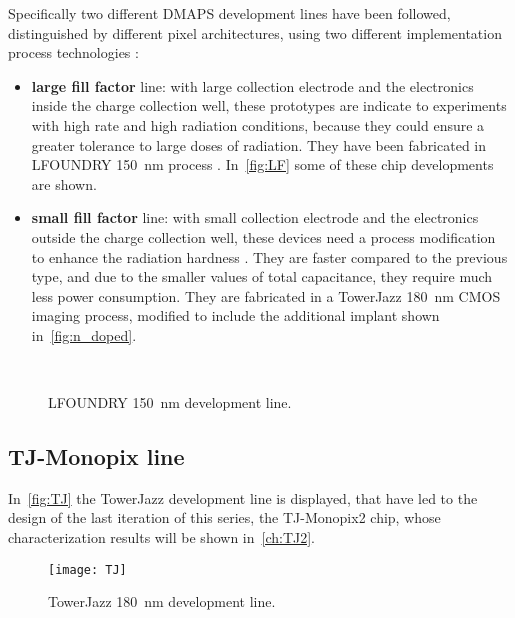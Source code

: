 Specifically two different DMAPS development lines have been followed, distinguished by different pixel architectures, using two different implementation process technologies \cite{Bespin:2020hge}:

\begin{itemize}
\item \textbf{large fill factor} line: with large collection electrode and the electronics inside the charge collection well, these prototypes are indicate to experiments with high rate and high radiation conditions, because they could ensure a greater tolerance to large doses of radiation. They have been fabricated in LFOUNDRY \SI{150}{nm} process \cite{Barbero:2019bkw}. In~\autoref{fig:LF} some of these chip developments are shown.
\item \textbf{small fill factor} line: with small collection electrode and the electronics outside the charge collection well, these devices need a process modification to enhance the radiation hardness \cite{SNOEYS201790}. They are faster compared to the previous type, and due to the smaller values of total capacitance, they require much less power consumption. They are fabricated in a TowerJazz \SI{180}{nm} CMOS imaging process, modified to include the additional implant shown in~\autoref{fig:n_doped}.
\end{itemize}

\begin{figure}[h!]
\centering
\subfigure[CCPD\_LF]
{\texttt{[image: LF1]}}\quad
\subfigure[LF-CPIX]
{\texttt{[image: LF2]}}\quad
\subfigure[LF-MONOPIX 1]
{\texttt{[image: LF3]}}\\
\caption{LFOUNDRY \SI{150}{nm} development line.}
\label{fig:LF}
\end{figure}


\subsection{TJ-Monopix line} \label{sec:TJ}

In~\autoref{fig:TJ} the TowerJazz development line is displayed, that have led to the design of the last iteration of this series, the TJ-Monopix2 chip, whose characterization results will be shown in~\autoref{ch:TJ2}.\\

\begin{figure}[h!]
\centering
\texttt{[image: TJ]}
\caption{TowerJazz \SI{180}{nm} development line.}
\label{fig:TJ}
\end{figure}

